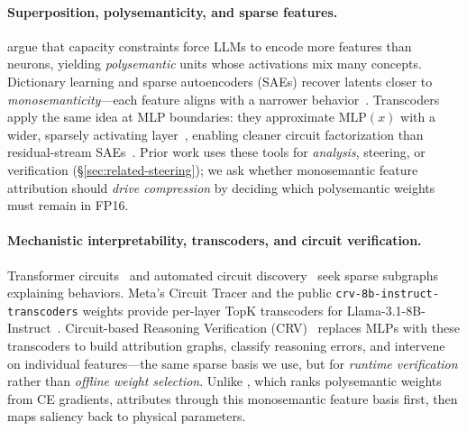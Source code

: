 \paragraph{Superposition, polysemanticity, and sparse features.}
\citet{elhage2021mathematical} argue that capacity constraints force LLMs to encode more features
than neurons, yielding \emph{polysemantic} units whose activations mix many concepts.
Dictionary learning and sparse autoencoders (SAEs) recover latents closer to
\emph{monosemanticity}---each feature aligns with a narrower behavior~\citep{bricken2023monosemanticity,cunningham2024sparse}.
Transcoders apply the same idea at MLP boundaries: they approximate $\mathrm{MLP}(x)$ with a
wider, sparsely activating layer~\citep{dunefsky2024transcoders}, enabling cleaner circuit
factorization than residual-stream SAEs~\citep{wright2025transcodersbeat}.
Prior work uses these tools for \emph{analysis}, steering, or verification
(\S\ref{sec:related-steering}); we ask whether monosemantic feature attribution should
\emph{drive compression} by deciding which polysemantic weights must remain in FP16.

\paragraph{Mechanistic interpretability, transcoders, and circuit verification.}
Transformer circuits~\citep{elhage2021mathematical} and automated circuit discovery~\citep{conmy2023automated}
seek sparse subgraphs explaining behaviors.
Meta's Circuit Tracer and the public \texttt{crv-8b-instruct-transcoders} weights provide
per-layer TopK transcoders for Llama-3.1-8B-Instruct~\citep{crv2026}.
Circuit-based Reasoning Verification (CRV)~\citep{crv2026} replaces MLPs with these transcoders
to build attribution graphs, classify reasoning errors, and intervene on individual features---the
same sparse basis we use, but for \emph{runtime verification} rather than \emph{offline weight
selection}.
Unlike \baseline{}, which ranks polysemantic weights from CE gradients, \method{} attributes through
this monosemantic feature basis first, then maps saliency back to physical parameters.

